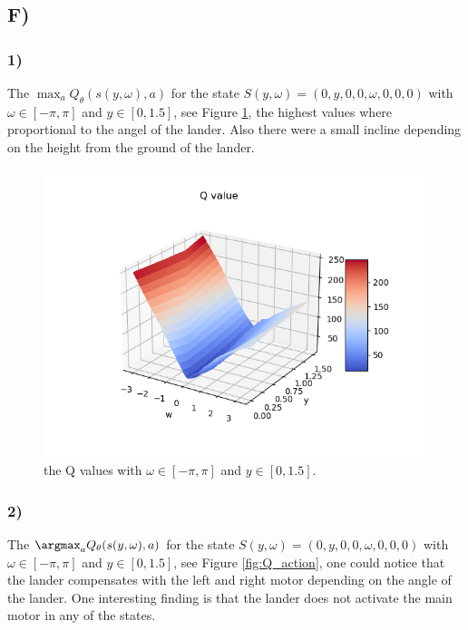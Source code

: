 \documentclass{article}
\begin{document}
\subsection*{F)}
\subsubsection*{1)}
The $\max_a Q_\theta(s(y,\omega),a)$ for the state $S(y,\omega) = (0,y,0,0,\omega,0,0,0)$ with $\omega \in [-\pi,\pi] $ and $y \in [0, 1.5]$, see Figure \ref{fig:Q_value}, the highest values where proportional to the angel of the lander. Also there were a small incline depending on the height from the ground of the lander. 
\begin{figure}[H]
    \centering
    \includegraphics[width=1\textwidth]{Lab_2/problem1/images/Q_values_2.png}
    \caption{\small the Q values with $\omega \in [-\pi,\pi] $ and $y \in [0, 1.5]$.}
    \label{fig:Q_value}
\end{figure}

\subsubsection*{2)}
The $\argmax_a Q_\theta(s(y,\omega),a)$ for the state $S(y,\omega) = (0,y,0,0,\omega,0,0,0)$ with $\omega \in [-\pi,\pi] $ and $y \in [0, 1.5]$, see Figure \ref{fig:Q_action}, one could notice that the lander compensates with the left and right motor depending on the angle of the lander. One interesting finding is that the lander does not activate the main motor in any of the states.
\end{document}
